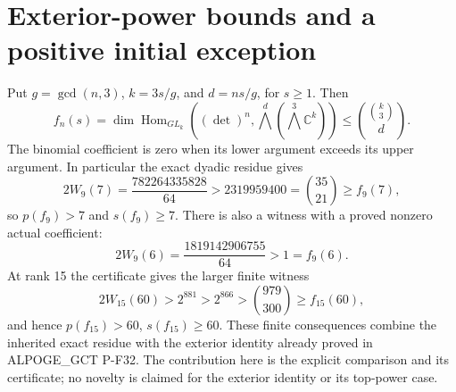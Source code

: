 \section{Exterior-power bounds and a positive initial exception}
\label{sec:exterior-witnesses}

\begin{proposition}
Put $g=\gcd(n,3)$, $k=3s/g$, and $d=ns/g$, for $s\ge1$.
Then
\[
 f_n(s)=\dim\operatorname{Hom}_{GL_k}
       ((\det)^n,\bigwedge^d(\bigwedge^3\mathbb C^k))
       \le \binom{\binom{k}{3}}{d}.
 \tag{PNEW-ext}
\]
The binomial coefficient is zero when its lower argument exceeds
its upper argument.  In particular the exact dyadic residue gives
\[
 2W_9(7)=\frac{782264335828}{64}
       >2319959400=\binom{35}{21}\ge f_9(7),
 \tag{PNEW-nine}
\]
so $p(f_9)>7$ and $s(f_9)\ge7$.
There is also a witness with a proved nonzero actual coefficient:
\[
 2W_9(6)=\frac{1819142906755}{64}>1=f_9(6).
 \tag{PNEW-nine-positive}
\]
At rank 15 the certificate gives the larger finite witness
\[
 2W_{15}(60)>2^{881}>2^{866}>\binom{979}{300}\ge f_{15}(60),
 \tag{PNEW-fifteen-sixty}
\]
and hence $p(f_{15})>60$, $s(f_{15})\ge60$.
These finite consequences combine the inherited exact residue with
the exterior identity already proved in ALPOGE\_GCT P-F32.
The contribution here is the explicit comparison and its certificate;
no novelty is claimed for the exterior identity or its top-power case.
\end{proposition}
